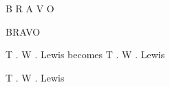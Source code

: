 \documentclass[multi={img},
               border=3mm]{standalone}
\begin{document}
\begin{img}
B\kern0pt R\kern0pt A\kern0pt V\kern0pt O
\end{img}

\begin{img}
BRAVO
\end{img}

\begin{img}
T\kern0pt .\kern2pt W\kern0pt .\kern2pt Lewis
{\tiny becomes}
T\kern-1pt .\kern2pt W\kern-2pt .\kern3pt Lewis
\end{img}

\begin{img}
T\kern-1pt .\kern1pt W\kern-2pt .\kern1pt Lewis
\end{img}
\end{document}
